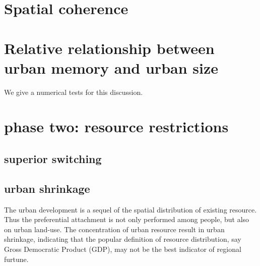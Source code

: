 \documentclass[aps,prl]{revtex4-1}
\begin{document}
\section{Spatial coherence}

\section{Relative relationship between urban memory and urban size}

We give a numerical tests for this discussion. 

\section{phase two: resource restrictions}

\subsection{superior switching}

\subsection{urban shrinkage}

The urban development is a sequel of the spatial distribution of existing resource. Thus the preferential attachment is not only performed among people, but also on urban land-use. The concentration of urban resource result in urban shrinkage, indicating that the popular definition of resource distribution, say Gross Democratic Product (GDP), may not be the best indicator of regional furtune.




\begin{thebibliography}{99}
\end{thebibliography}
    
    
\end{document}

